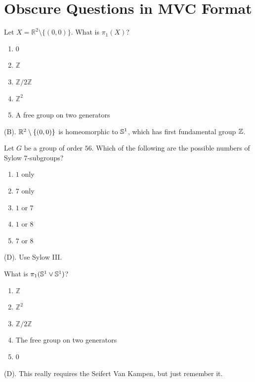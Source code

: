 \section{Obscure Questions in MVC Format}

\begin{exercise}
Let $X=\mathbb{R}^2\setminus\{(0,0)\}$. What is $\pi_1(X)$?

\begin{enumerate}[label=(\Alph*)]
    \item $0$
    \item $\mathbb{Z}$
    \item $\mathbb{Z}/2\mathbb{Z}$
    \item $\mathbb{Z}^2$
    \item A free group on two generators
\end{enumerate}
\end{exercise}
\begin{solution}
(B). $\R^2 \setminus \{(0,0)\}$ is homeomorphic to $\S^1$, which has 
first fundamental group $\Z$.
\end{solution}

\begin{exercise}
Let $G$ be a group of order $56$. Which of the following are the possible numbers of Sylow $7$-subgroups?

\begin{enumerate}[label=(\Alph*)]
    \item $1$ only
    \item $7$ only
    \item $1$ or $7$
    \item $1$ or $8$
    \item $7$ or $8$
\end{enumerate}
\end{exercise}
\begin{solution}
(D). Use Sylow III.
\end{solution}

\begin{exercise}
What is $\pi_1(\S^1\vee\S^1)$?
\begin{enumerate}[label=(\Alph*)]
    \item $\mathbb{Z}$
    \item $\mathbb{Z}^2$
    \item $\mathbb{Z}/2\mathbb{Z}$
    \item The free group on two generators
    \item $0$
\end{enumerate}
\end{exercise}
\begin{solution}
(D). This really requires the Seifert Van Kampen, but just remember it.
\end{solution}

